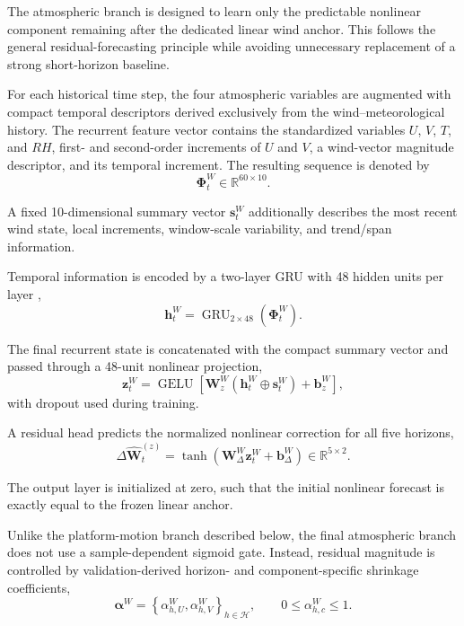 The atmospheric branch is designed to learn only the predictable nonlinear component remaining after the dedicated linear wind anchor. This follows the general residual-forecasting principle while avoiding unnecessary replacement of a strong short-horizon baseline.

For each historical time step, the four atmospheric variables are augmented with compact temporal descriptors derived exclusively from the wind--meteorological history. The recurrent feature vector contains the standardized variables $U$, $V$, $T$, and $RH$, first- and second-order increments of $U$ and $V$, a wind-vector magnitude descriptor, and its temporal increment. The resulting sequence is denoted by
\begin{equation}
\boldsymbol{\Phi}_t^W
\in
\mathbb R^{60\times10}.
\label{eq:wind_features}
\end{equation}

A fixed 10-dimensional summary vector $\mathbf s_t^W$ additionally describes the most recent wind state, local increments, window-scale variability, and trend/span information.

Temporal information is encoded by a two-layer GRU with 48 hidden units per layer \cite{Cho2014GRU},
\begin{equation}
\mathbf h_t^W
=
\operatorname{GRU}_{2\times48}
\left(
\boldsymbol{\Phi}_t^W
\right).
\label{eq:wind_gru}
\end{equation}

The final recurrent state is concatenated with the compact summary vector and passed through a 48-unit nonlinear projection,
\begin{equation}
\mathbf z_t^W
=
\operatorname{GELU}
\left[
\mathbf W_z^W
\left(
\mathbf h_t^W
\oplus
\mathbf s_t^W
\right)
+
\mathbf b_z^W
\right],
\label{eq:wind_fusion}
\end{equation}
with dropout used during training.

A residual head predicts the normalized nonlinear correction for all five horizons,
\begin{equation}
\Delta\hat{\mathbf W}^{(z)}_t
=
\tanh
\left(
\mathbf W_\Delta^W
\mathbf z_t^W
+
\mathbf b_\Delta^W
\right)
\in
\mathbb R^{5\times2}.
\label{eq:wind_residual_head}
\end{equation}

The output layer is initialized at zero, such that the initial nonlinear forecast is exactly equal to the frozen linear anchor.

Unlike the platform-motion branch described below, the final atmospheric branch does not use a sample-dependent sigmoid gate. Instead, residual magnitude is controlled by validation-derived horizon- and component-specific shrinkage coefficients,
\begin{equation}
\boldsymbol{\alpha}^{W}
=
\left\{
\alpha_{h,U}^{W},
\alpha_{h,V}^{W}
\right\}_{h\in\mathcal H},
\qquad
0
\leq
\alpha_{h,c}^{W}
\leq
1.
\label{eq:wind_alpha_set}
\end{equation}


